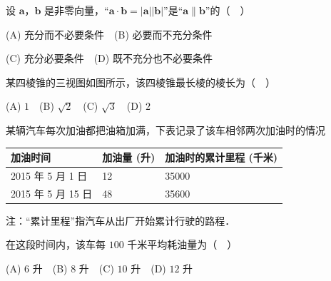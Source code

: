 \begin{question}
设 \(\boldsymbol{a}\)，\(\boldsymbol{b}\) 是非零向量，“\(\boldsymbol{a}\cdot\boldsymbol{b}=|\boldsymbol{a}||\boldsymbol{b}|\)”是“\(\boldsymbol{a}\parallel\boldsymbol{b}\)”的（　）

(A) 充分而不必要条件　(B) 必要而不充分条件

(C) 充分必要条件　(D) 既不充分也不必要条件

\Needspace{0.4\textheight}
\end{question}
\begin{question}
某四棱锥的三视图如图所示，该四棱锥最长棱的棱长为（　）
\nopagebreak[4]
\begin{center}\end{center}
\nopagebreak[4]
(A) \(1\)　(B) \(\sqrt{2}\)　(C) \(\sqrt{3}\)　(D) \(2\)

\end{question}
\begin{question}
某辆汽车每次加油都把油箱加满，下表记录了该车相邻两次加油时的情况

\begin{center}
\begin{tabular}{lll}
\toprule
加油时间 & 加油量 (升) & 加油时的累计里程 (千米) \\
\midrule
2015 年 5 月 1 日 & 12 & 35000 \\
2015 年 5 月 15 日 & 48 & 35600 \\
\bottomrule
\end{tabular}
\end{center}

注：“累计里程”指汽车从出厂开始累计行驶的路程．

在这段时间内，该车每 \(100\) 千米平均耗油量为（　）

(A) \(6\) 升　(B) \(8\) 升　(C) \(10\) 升　(D) \(12\) 升

\end{question}

